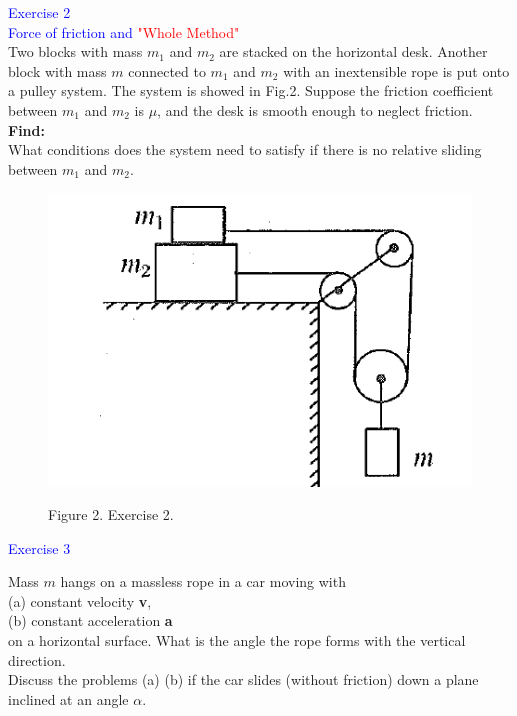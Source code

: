 \documentclass{beamer}
\begin{document}
\begin{frame}
\textcolor{blue}{Exercise 2}\\
\textcolor{blue}{\footnotesize{Force of friction and \textcolor{red}{"Whole Method"}}}\\

Two blocks with mass $m_1$ and $m_2$ are stacked on the horizontal desk. Another block with mass $m$ connected to $m_1$ and $m_2$ with an inextensible rope is put onto a pulley system. The system is showed in Fig.2. Suppose the friction coefficient between $m_1$ and $m_2$ is $\mu$, and the desk is smooth enough to neglect friction. \textbf{Find:}\\ 
What conditions does the system need to satisfy if there is no relative sliding between $m_1$ and $m_2$.
\begin{figure}[htbp]
\centering
\includegraphics[width=0.35 \linewidth, angle =0]{ex2.png}
\begin{center}
  Figure 2. Exercise 2.
\end{center}
\label{fig:2}
\end{figure}
\end{frame} 

\begin{frame}
\textcolor{blue}{Exercise 3}

Mass $m$ hangs on a massless rope in a car moving with\\ 
(a) constant velocity \textbf{v},\\
(b) constant acceleration \textbf{a}\\
on a horizontal surface. What is the angle the rope forms with the vertical direction.\\
Discuss the problems (a) (b) if the car slides (without friction) down a plane inclined at an angle $\alpha$.
\end{frame}
\end{document}
